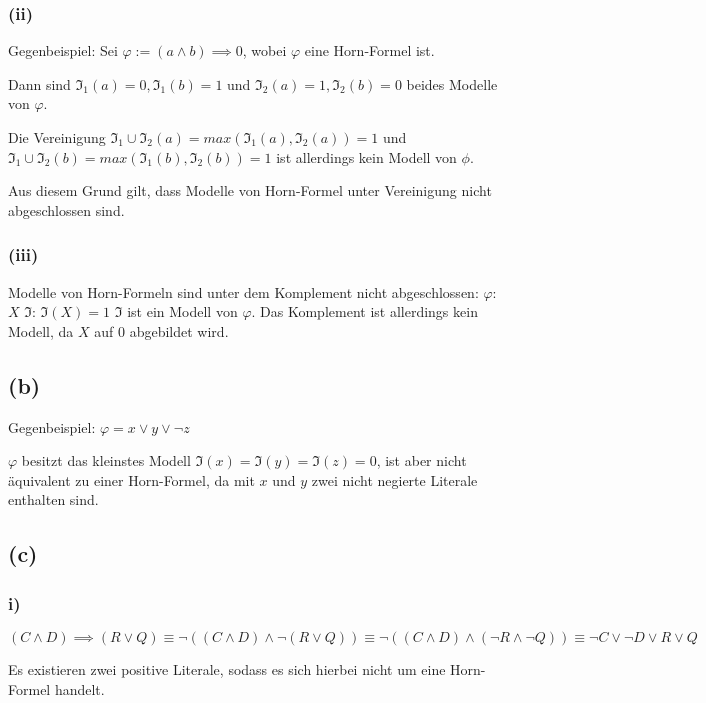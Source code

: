 \documentclass[11pt, a4paper]{article}
\renewcommand{\v}{\vee}
\newcommand{\n}{\wedge}
\begin{document}
\subsubsection*{(ii)}
Gegenbeispiel:
Sei $\varphi := (a \n b) \implies 0$, wobei $\varphi$ eine Horn-Formel ist.

Dann sind $\mathfrak{I}_1(a) = 0, \mathfrak{I}_1(b) = 1$ und $\mathfrak{I}_2(a) = 1, \mathfrak{I}_2(b) = 0$ beides Modelle von $\varphi$.

Die Vereinigung $\mathfrak{I}_1 \cup \mathfrak{I}_2(a) = max(\mathfrak{I}_1(a), \mathfrak{I}_2(a)) = 1$ und $\mathfrak{I}_1 \cup \mathfrak{I}_2(b) = max(\mathfrak{I}_1(b), \mathfrak{I}_2(b)) = 1$ ist allerdings kein Modell von $\phi$.

Aus diesem Grund gilt, dass Modelle von Horn-Formel unter Vereinigung nicht abgeschlossen sind.

\subsubsection*{(iii)}
Modelle von Horn-Formeln sind unter dem Komplement nicht abgeschlossen:\newline
$\varphi$: $X$\newline
$\mathfrak{I}$: $\mathfrak{I}(X)=1$\newline
$\mathfrak{I}$ ist ein Modell von $\varphi$. Das Komplement ist allerdings kein Modell, da $X$ auf $0$ abgebildet wird.

\subsection*{(b)}
Gegenbeispiel:
$\varphi = x \v y \v \neg z$

$\varphi$ besitzt das kleinstes Modell $\mathfrak{I}(x) = \mathfrak{I}(y) = \mathfrak{I}(z) = 0$, ist aber nicht äquivalent zu einer Horn-Formel, da mit $x$ und $y$ zwei nicht negierte Literale enthalten sind.

\subsection*{(c)}
\subsubsection*{i)}
$(C \n D) \implies (R \v Q) \equiv \neg ((C \n D) \n \neg (R \v Q)) \equiv \neg ((C \n D) \n (\neg R \n \neg Q)) \equiv \neg C \v \neg D \v R \v Q$

Es existieren zwei positive Literale, sodass es sich hierbei nicht um eine Horn-Formel handelt.
\end{document}
